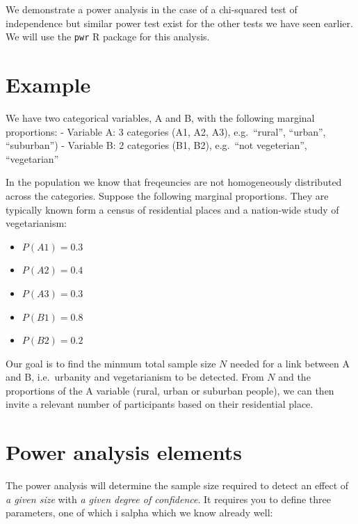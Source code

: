 \documentclass[
  letterpaper,
  DIV=11,
  numbers=noendperiod]{scrreprt}
\providecommand{\tightlist}{%
  \setlength{\itemsep}{0pt}\setlength{\parskip}{0pt}}\usepackage{longtable,booktabs,array}
\begin{document}
We demonstrate a power analysis in the case of a chi-squared test of
independence but similar power test exist for the other tests we have
seen earlier. We will use the \texttt{pwr} R package for this analysis.

\section{Example}\label{example-14}

We have two categorical variables, A and B, with the following marginal
proportions: - Variable A: 3 categories (A1, A2, A3), e.g.~``rural'',
``urban'', ``suburban'') - Variable B: 2 categories (B1, B2), e.g.~``not
vegeterian'', ``vegetarian''

In the population we know that freqeuncies are not homogeneously
distributed across the categories. Suppose the following marginal
proportions. They are typically known form a census of residential
places and a nation-wide study of vegetarianism:

\begin{itemize}
\tightlist
\item
  \(P(A1) = 0.3\)
\item
  \(P(A2) = 0.4\)
\item
  \(P(A3) = 0.3\)
\item
  \(P(B1) = 0.8\)
\item
  \(P(B2) = 0.2\)
\end{itemize}

Our goal is to find the minmum total sample size \(N\) needed for a link
between A and B, i.e.~urbanity and vegetarianism to be detected. From
\(N\) and the proportions of the A variable (rural, urban or suburban
people), we can then invite a relevant number of participants based on
their residential place.

\section{Power analysis elements}\label{power-analysis-elements}

The power analysis will determine the sample size required to detect an
effect of \emph{a given size} with \emph{a given degree of confidence}.
It requires you to define three parameters, one of which i salpha which
we know already well:
\end{document}
